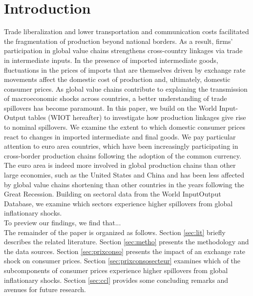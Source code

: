 \documentclass[11pt,a4paper]{article}
\begin{document}
\section{Introduction}
Trade liberalization and lower transportation and communication costs facilitated the fragmentation of production beyond national borders. As a result, firms' participation in global value chains strengthens cross-country linkages via trade in intermediate inputs. 
In the presence of imported intermediate goods, fluctuations in the prices of imports that are themselves driven by exchange rate movements affect the domestic cost of production and, ultimately, domestic consumer prices. 
As global value chains contribute to explaining the transmission of macroeconomic shocks across countries, a better understanding of trade spillovers has become paramount.  
In this paper, we build on the World Input-Output tables (WIOT hereafter) to investigate how production linkages give rise to nominal spillovers. 
We examine the extent to which domestic consumer prices react to changes in imported intermediate and final goods.
We pay particular attention to euro area countries, which have been increasingly participating in cross-border production chains following the adoption of the common currency. The euro area is indeed more involved in global production chains than other large economies, such as the United States and China \citep{ECB2016} and has been less affected by global value chains shortening than other countries in the years following the Great Recession. 
Building on sectoral data from the World InputOutput Database, we examine which sectors experience higher spillovers from global inflationary shocks.\\
To preview our findings, we find that...\\
The remainder of the paper is organized as follows. Section \ref{sec:lit} briefly describes the related literature. Section \ref{sec:metho} presents the methodology and the data sources.  Section \ref{sec:prixconso} presents the impact of an exchange rate shock on consumer prices.  Section \ref{sec:prixconsosecteur} examines which of the subcomponents of consumer prices experience higher spillovers from global inflationary shocks.
Section \ref{sec:ccl} provides some concluding remarks and avenues for future research.

\label{sec:intro}
\end{document}
